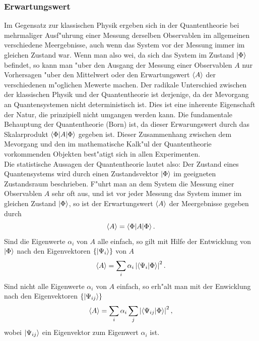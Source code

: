       \subsubsection{Erwartungswert}
         Im Gegensatz zur klassischen Physik ergeben sich in der Quantentheorie bei mehrmaliger Ausf"uhrung einer Messung derselben Observablen im allgemeinen
         verschiedene Me\3ergebnisse, auch wenn das System vor der Messung immer im gleichen Zustand war. Wenn man also wei\3, da\3 sich das System im Zustand
         ${\left| \Phi \right>}$ befindet, so kann man "uber den Ausgang der Messung einer Observablen $A$ nur Vorhersagen "uber den Mittelwert oder den Erwartungswert
         $\left< A \right>$ der verschiedenen m"oglichen Me\3werte machen. Der radikale Unterschied zwischen der klassischen Physik und der Quantentheorie ist derjenige, da\3 der 
         Me\3vorgang an Quantensystemen nicht deterministisch ist. Dies ist eine inherente Eigenschaft der Natur, die prinzipiell nicht umgangen werden kann. Die fundamentale
         Behauptung der Quantentheorie (Born) ist, da\3 dieser Erwarungswert durch das
         Skalarprodukt $\left< \Phi | A | \Phi \right>$ gegeben ist. Dieser Zusammenhang zwischen dem Me\3vorgang und den im mathematische Kalk"ul der Quantentheorie 
         vorkommenden Objekten best"atigt sich in allen Experimenten. \\
         Die statistische Aussagen der Quantentheorie lautet also:
         Der Zustand eines Quantensystems wird durch einen Zustandsvektor $\left| \Phi \right>$ im geeigneten Zustandsraum \raum{} beschrieben. F"uhrt man an dem System die Messung einer
         Observablen $A$ sehr oft aus, und ist vor jeder Messung das System immer im gleichen Zustand $\left| \Phi \right>$, so ist der Erwartungswert $\left< A \right>$ der 
         Me\3ergebnisse gegeben durch
         $$ \left< A \right> = \left< \Phi | A | \Phi \right>. $$
         Sind die Eigenwerte $\alpha_i$ von $A$ alle einfach, so gilt mit Hilfe der Entwicklung von $\left| \Phi \right>$ nach den Eigenvektoren $\left\{ \left| \Psi_i \right> \right\}$ von $A$
         $$ \left< A \right> = \sum_i \alpha_i\left| \left< \Psi_i | \Phi \right> \right|^2. $$
         Sind nicht alle Eigenwerte $\alpha_i$ von $A$ einfach, so erh"alt man mit der Enwicklung nach den Eigenvektoren $\left\{ \left| \Psi_{ij} \right> \right\}$
         $$ \left< A \right> = \sum_i \alpha_i \sum_j \left| \left< \Psi_{ij} | \Phi \right> \right|^2, $$
         wobei $\left| \Psi_{ij} \right>$ ein Eigenvektor zum Eigenwert $\alpha_i$ ist.
